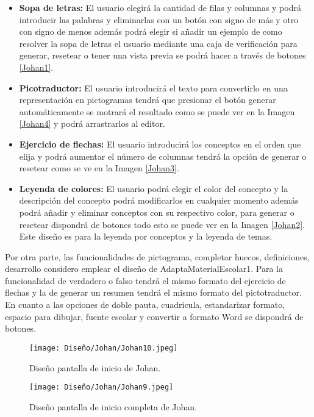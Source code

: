 \begin{itemize}
    \item \textbf{Sopa de letras:} El usuario elegirá la cantidad de filas y columnas y podrá introducir las palabras y eliminarlas con un botón con signo de más y otro con signo de menos además podrá elegir si añadir un ejemplo de como resolver la sopa de letras el usuario mediante una caja de verificación para generar, resetear o tener una vista previa se podrá hacer a través de botones \ref{Johan1}. 
    \item \textbf{Picotraductor:} El usuario introducirá el texto para convertirlo en una representación en pictogramas tendrá que presionar el botón generar automáticamente se motrará el resultado como se puede ver en la Imagen \ref{Johan4} y podrá arrastrarlos al editor.
    \item \textbf{Ejercicio de flechas:} El usuario introducirá los conceptos en el orden que elija y podrá aumentar el número de columnas tendrá la opción de generar o resetear como se ve en la Imagen \ref{Johan3}.
    \item  \textbf{Leyenda de colores:} El usuario podrá elegir el color del concepto y la descripción del concepto podrá modificarlos en cualquier momento además podrá añadir y eliminar conceptos con su respectivo color, para generar o resetear dispondrá de botones todo esto se puede ver en la Imagen \ref{Johan2}. Este diseño es para la leyenda por conceptos y la leyenda de temas.
\end{itemize}
Por otra parte, las funcionalidades de pictograma, completar huecos, definiciones, desarrollo considero emplear el diseño de AdaptaMaterialEscolar1. Para la funcionalidad de verdadero o falso tendrá el mismo formato del ejercicio de flechas y la de generar un resumen tendrá el mismo formato del pictotraductor. En cuanto a las opciones de doble pauta, cuadricula, estandarizar formato, espacio para dibujar, fuente escolar y convertir a formato Word se dispondrá de botones.

\begin{figure}[ht!]
  \centering
  \texttt{[image: Diseño/Johan/Johan10.jpeg]}
  \caption{Diseño pantalla de inicio de Johan.}
  \label{Johan10}
\end{figure}

\begin{figure}[ht!]
  \centering
  \texttt{[image: Diseño/Johan/Johan9.jpeg]}
  \caption{Diseño pantalla de inicio completa de Johan.}
  \label{Johan9}
\end{figure}

